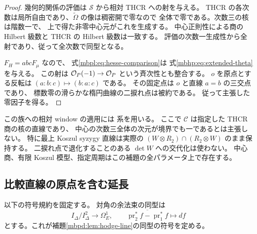 \begin{proof}
幾何的関係の評価は $\mathcal S$ から相対 THCR への射を与える。
THCR の各次数は局所自由であり、$\widetilde\Omega$ の像は稠密開で零なので
全体で零である。次数三の核は階数一で、
上で得た非零中心元がこれを生成する。
中心正則性による商の Hilbert 級数と THCR の Hilbert 級数は一致する。
評価の次数一生成性から全射であり、従って全次数で同型となる。

$F_H=abcF_\mu$ なので、
式\eqref{mbpl:eq:hesse-comparison}は
式\eqref{mbhp:eq:extended-theta}を与える。
この射は $\mathcal O_P(-1)\to\mathcal O_P$ という斉次性とも整合する。
$o$ を原点とする反転は $(a:b:c)\mapsto(b:a:c)$ である。
その固定点は $o$ と直線 $a=b$ の三交点であり、
標数零の滑らかな楕円曲線の二捩れ点は被約である。
従って主張した零因子を得る。
\end{proof}

この族への相対 window の適用には
系を用いる。
ここで $\mathcal C$ は指定した THCR 商の核の直線であり、
中心の次数三全体の次元が境界でも一であるとは主張しない。
特に最上 Koszul syzygy 直線は実際の
$(W\otimes R_2)\cap(R_2\otimes W)$ のまま保持する。
二捩れ点で退化することのある $\det W$ への交代化は使わない。
中心商、有限 Koszul 模型、指定周期はこの補題の全パラメータ上で存在する。

\subsection{比較直線の原点を含む延長}

以下の符号規約を固定する。
対角の余法束の同型は
\begin{equation}\label{mbhp:eq:conormal-sign}
 I_\Delta/I_\Delta^2\longrightarrow\Omega^1_E,\qquad
 \overline{\operatorname{pr}_2^*f-\operatorname{pr}_1^*f}\longmapsto df
\end{equation}
とする。これが補題\ref{mbpd:lem:hodge-line}の同型の符号を定める。


